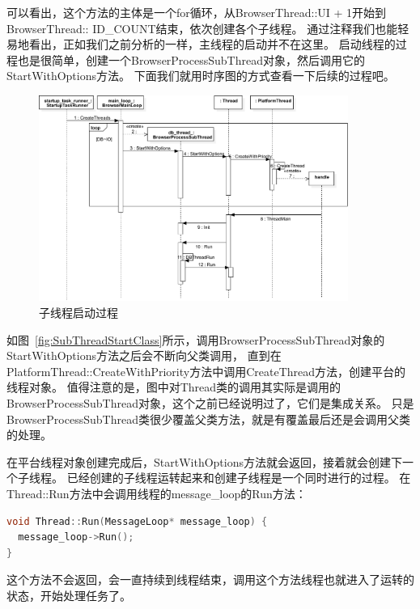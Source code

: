 可以看出，这个方法的主体是一个for循环，从BrowserThread::UI + 1开始到BrowserThread:: ID\_COUNT结束，依次创建各个子线程。
通过注释我们也能轻易地看出，正如我们之前分析的一样，主线程的启动并不在这里。
启动线程的过程也是很简单，创建一个BrowserProcessSubThread对象，然后调用它的StartWithOptions方法。
下面我们就用时序图的方式查看一下后续的过程吧。

\begin{figure}[H] 
  \centering 
  \includegraphics[width=0.90\textwidth]{image/process_study/SubThreadStartSuquence.pdf} 
  \caption{子线程启动过程} \label{fig:SubThreadStartSuquence} 
\end{figure}

如图~\ref{fig:SubThreadStartClass}所示，调用BrowserProcessSubThread对象的StartWithOptions方法之后会不断向父类调用，
直到在 PlatformThread::CreateWithPriority方法中调用CreateThread方法，创建平台的线程对象。
值得注意的是，图中对Thread类的调用其实际是调用的BrowserProcessSubThread对象，这个之前已经说明过了，它们是集成关系。
只是BrowserProcessSubThread类很少覆盖父类方法，就是有覆盖最后还是会调用父类的处理。

在平台线程对象创建完成后，StartWithOptions方法就会返回，接着就会创建下一个子线程。
已经创建的子线程运转起来和创建子线程是一个同时进行的过程。
在Thread::Run方法中会调用线程的message\_loop的Run方法：
\begin{spacing}{1.0}
\begin{lstlisting}[language={C++}]
void Thread::Run(MessageLoop* message_loop) {
  message_loop->Run();
}
\end{lstlisting}
\end{spacing}
这个方法不会返回，会一直持续到线程结束，调用这个方法线程也就进入了运转的状态，开始处理任务了。

%
%
%
